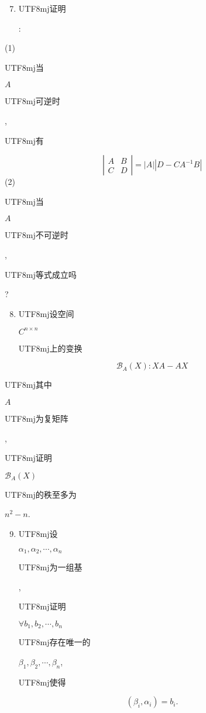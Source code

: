 \documentclass[10pt]{article}
\begin{document}
\begin{enumerate}
  \setcounter{enumi}{6}
  \item \begin{CJK}{UTF8}{mj}证明\end{CJK}:
\end{enumerate}
(1) \begin{CJK}{UTF8}{mj}当\end{CJK} $A$ \begin{CJK}{UTF8}{mj}可逆时\end{CJK}, \begin{CJK}{UTF8}{mj}有\end{CJK}
$$
\left|\begin{array}{ll}
A & B \\
C & D
\end{array}\right|=|A|\left|D-C A^{-1} B\right|
$$
(2) \begin{CJK}{UTF8}{mj}当\end{CJK} $A$ \begin{CJK}{UTF8}{mj}不可逆时\end{CJK}, \begin{CJK}{UTF8}{mj}等式成立吗\end{CJK}?

\begin{enumerate}
  \setcounter{enumi}{7}
  \item \begin{CJK}{UTF8}{mj}设空间\end{CJK} $C^{n \times n}$ \begin{CJK}{UTF8}{mj}上的变换\end{CJK}
\end{enumerate}
$$
\mathscr{B}_{A}(X): X A-A X
$$
\begin{CJK}{UTF8}{mj}其中\end{CJK} $A$ \begin{CJK}{UTF8}{mj}为复矩阵\end{CJK}, \begin{CJK}{UTF8}{mj}证明\end{CJK} $\mathscr{B}_{A}(X)$ \begin{CJK}{UTF8}{mj}的秩至多为\end{CJK} $n^{2}-n$.

\begin{enumerate}
  \setcounter{enumi}{8}
  \item \begin{CJK}{UTF8}{mj}设\end{CJK} $\alpha_{1}, \alpha_{2}, \cdots, \alpha_{n}$ \begin{CJK}{UTF8}{mj}为一组基\end{CJK}, \begin{CJK}{UTF8}{mj}证明\end{CJK} $\forall b_{1}, b_{2}, \cdots, b_{n}$ \begin{CJK}{UTF8}{mj}存在唯一的\end{CJK} $\beta_{1}, \beta_{2}, \cdots, \beta_{n}$, \begin{CJK}{UTF8}{mj}使得\end{CJK}
\end{enumerate}
$$
\left(\beta_{i}, \alpha_{i}\right)=b_{i} .
$$
\end{document}
